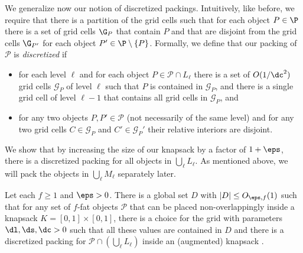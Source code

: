 We generalize now our notion of discretized packings. Intuitively,
like before, we require that there is a partition of the grid cells
such that for each object $P\in\P$ there is a set of grid cells $\G_{P}$
that contain $P$ and that are disjoint from the grid cells $\G_{P'}$
for each object $P'\in\P\setminus\{P\}$. Formally, we define that
our packing of $\mathcal{P}$ is \emph{discretized} if
\begin{itemize}
\item for each level $\ell$ and for each object $P\in\mathcal{P}\cap L_{\ell}$
there is a set of $O(1/\dc^{2})$ grid cells
$\mathcal{G}_{P}$
of level $\ell$ such that $P$ is contained in $\mathcal{G}_{P}$,
and there is a single grid cell of level $\ell-1$ that contains all
grid cells in $\mathcal{G}_{P}$, and
\item for any two objects $P,P'\in\mathcal{P}$ (not necessarily of the
same level) and for any two grid cells $C\in\mathcal{G}_{P}$ and
$C'\in\mathcal{G}_{P}'$ their relative interiors are disjoint.
\end{itemize}
We show that by increasing the size of our knapsack by a factor of
$1+\eps$, there is a discretized packing for all objects in {$\bigcup_{\ell}L_{\ell}$}.
As mentioned above, we will pack the objects in {$\bigcup_{\ell}M_{\ell}$}
separately later. %


\begin{lemma}%
	\label{lem:fatdiscrete} Let each $f\ge1$ and $\eps>0$.
There is a global set $D$ with $|D| \le O_{\eps,f}(1)$ such that for
any set of $f$-fat objects $\mathcal{P}$ that can be placed non-overlappingly
inside a knapsack $K=[0,1]\times[0,1]$, there is a choice for the
grid with parameters $\dl,\ds,\dc>0$ such that all these values are
contained in $D$ and there is a discretized packing for $\mathcal{P}\cap (\bigcup_{\ell}L_{\ell})$
inside an (augmented) knapsack \ari{$[0,1+O(\eps)]\times[0,1+O(\eps)]$}. \end{lemma}

